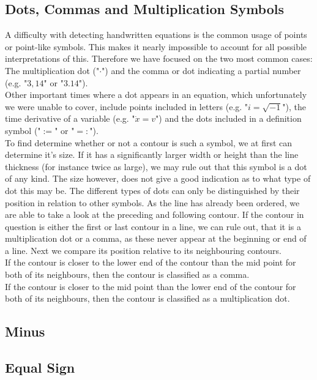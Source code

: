 \documentclass[12pt]{article}
\begin{document}
\begin{itemize}
\begin{itemize}
\begin{itemize}
\begin{itemize}
\begin{itemize}
\begin{itemize}
\begin{itemize}
\begin{itemize}
\begin{itemize}
\begin{itemize}
	\subsection{Dots, Commas and Multiplication Symbols}
	A difficulty with detecting handwritten equations is the common usage of points or point-like symbols.
	This makes it nearly impossible to account for all possible interpretations of this.
	Therefore we have focused on the two most common cases:
	The multiplication dot ("$\cdot$") and the comma or dot indicating a partial number (e.g. "$3,14$" or "$3.14$").\\
	Other important times where a dot appears in an equation, which unfortunately we were unable to cover, include points included in letters (e.g. "$i=\sqrt{-1}$"), the time derivative of a variable (e.g. "$\dot{x}=v$") and the dots included in a definition symbol ("$:=$" or "$=:$").\\  %
	To find determine whether or not a contour is such a symbol, we at first can determine it's size.
	If it has a significantly larger width or height than the line thickness (for instance twice as large), we may rule out that this symbol is a dot of any kind.
	The size however, does not give a good indication as to what type of dot this may be.
	The different types of dots can only be distinguished by their position in relation to other symbols.
	As the line has already been ordered, we are able to take a look at the preceding and following contour.
	If the contour in question is either the first or last contour in a line, we can rule out, that it is a multiplication dot or a comma, as these never appear at the beginning or end of a line.
	Next we compare its position relative to its neighbouring contours.\\
	If the contour is closer to the lower end of the contour than the mid point for both of its neighbours, then the contour is classified as a comma.\\
	
	If the contour is closer to the mid point than the lower end of the contour for both of its neighbours, then the contour is classified as a multiplication dot.\\
	
	
	\subsection{Minus}
	
	\subsection{Equal Sign}
	

\end{itemize}
\end{itemize}
\end{itemize}
\end{itemize}
\end{itemize}
\end{itemize}
\end{itemize}
\end{itemize}
\end{itemize}
\end{itemize}
\end{document}
